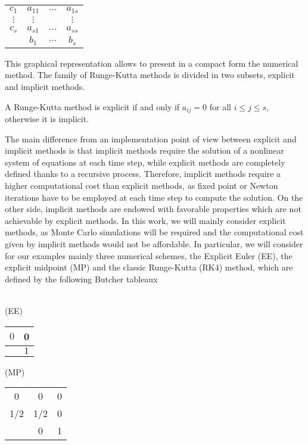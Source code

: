 \begin{center}
	\begin{tabular}{c|ccc}
		$c_1$ & $a_{11}$ & $\ldots$ & $a_{1s}$\\
		$\vdots$ & $\vdots$ & & $\vdots$ \\
		$c_s$ & $a_{s1}$ & $\ldots$ & $a_{ss}$\\
		\hline 
		&$b_1$ & $\ldots$ & $b_s$
	\end{tabular}
\end{center}
This graphical representation allows to present in a compact form the numerical method. The family of Runge-Kutta methods is divided in two subsets, explicit and implicit methods.
\begin{definition} A Runge-Kutta method is explicit if and only if $a_{ij} = 0$ for all $i \leq j \leq s$, otherwise it is implicit. 
\end{definition}
\noindent The main difference from an implementation point of view between explicit and implicit methods is that implicit methods require the solution of a nonlinear system of equations at each time step, while explicit methods are completely defined thanks to a recursive process. Therefore, implicit methods require a higher computational cost than explicit methods, as fixed point or Newton iterations have to be employed at each time step to compute the solution. On the other side, implicit methods are endowed with favorable properties which are not achievable by explicit methods. In this work, we will mainly consider explicit methods, as Monte Carlo simulations will be required and the computational cost given by implicit methods would not be affordable. In particular, we will consider for our examples mainly three numerical schemes, the Explicit Euler (EE), the explicit midpoint (MP) and the classic Runge-Kutta (RK4) method, which are defined by the following Butcher tableaux \\ \\
\begin{minipage}{0.2\linewidth} 
	\begin{center}
		(EE)
		\begin{tabular}{c|c}
			$0$ & 0 \\
			\hline 
			&$1$ 
		\end{tabular}
	\end{center}
\end{minipage}
\begin{minipage}{0.3\linewidth} 
	\begin{center}
		(MP)
		\begin{tabular}{c|cc}
			0 & 0 & 0 \\
			1/2 & 1/2 & 0 \\
			\hline 
			& 0 & 1 
		\end{tabular}
	\end{center}
\end{minipage}
